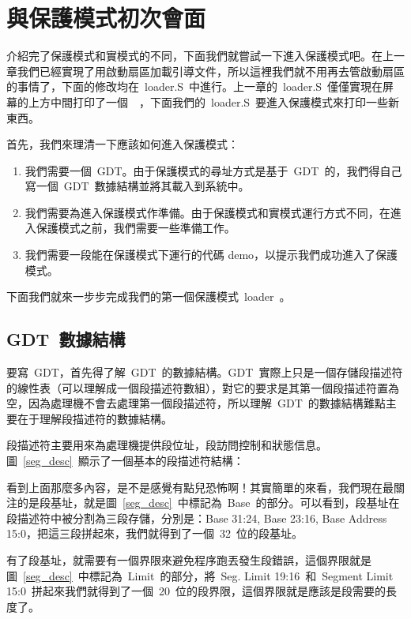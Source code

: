 \section{與保護模式初次會面}

介紹完了保護模式和實模式的不同，下面我們就嘗試一下進入保護模式吧。在上一章我們已經實現了用啟動扇區加載引導文件，所以這裡我們就不用再去管啟動扇區的事情了，下面的修改均在~loader.S~中進行。上一章的~loader.S~僅僅實現在屏幕的上方中間打印了一個~~，下面我們的~loader.S~要進入保護模式來打印一些新東西。

首先，我們來理清一下應該如何進入保護模式：

\begin{enumerate}
  \item 我們需要一個~GDT。由于保護模式的尋址方式是基于~GDT~的，我們得自己寫一個~GDT~數據結構並將其載入到系統中。
  \item 我們需要為進入保護模式作準備。由于保護模式和實模式運行方式不同，在進入保護模式之前，我們需要一些準備工作。
  \item 我們需要一段能在保護模式下運行的代碼 demo，以提示我們成功進入了保護模式。
\end{enumerate}

下面我們就來一步步完成我們的第一個保護模式~loader~。

\subsection{GDT~數據結構}

要寫~GDT，首先得了解~GDT~的數據結構。GDT~實際上只是一個存儲段描述符的線性表（可以理解成一個段描述符數組），對它的要求是其第一個段描述符置為空，因為處理機不會去處理第一個段描述符，所以理解~GDT~的數據結構難點主要在于理解段描述符的數據結構。

段描述符主要用來為處理機提供段位址，段訪問控制和狀態信息。圖~\ref{seg_desc}~顯示了一個基本的段描述符結構：


看到上面那麼多內容，是不是感覺有點兒恐怖啊！其實簡單的來看，我們現在最關注的是段基址，就是圖~\ref{seg_desc}~中標記為~Base~的部分。可以看到，段基址在段描述符中被分割為三段存儲，分別是：Base 31:24, Base 23:16, Base Address 15:0，把這三段拼起來，我們就得到了一個~32~位的段基址。

有了段基址，就需要有一個界限來避免程序跑丟發生段錯誤，這個界限就是圖~\ref{seg_desc}~中標記為~Limit~的部分，將~Seg. Limit 19:16~和~Segment Limit 15:0~拼起來我們就得到了一個~20~位的段界限，這個界限就是應該是段需要的長度了。

